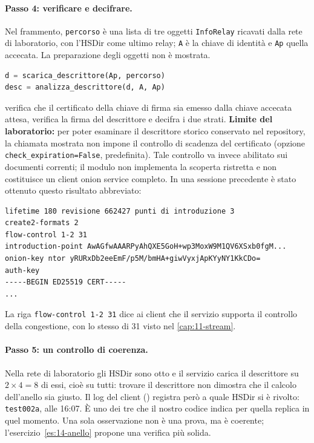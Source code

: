 \paragraph{Passo 4: verificare e decifrare.} Nel frammento, \texttt{percorso} è una lista di tre oggetti \texttt{InfoRelay} ricavati dalla rete di laboratorio, con l'HSDir come ultimo relay; \texttt{A} è la chiave di identità e \texttt{Ap} quella accecata. La preparazione degli oggetti non è mostrata.
\begin{lstlisting}[language=Python]
d = scarica_descrittore(Ap, percorso)
desc = analizza_descrittore(d, A, Ap)
\end{lstlisting}
 verifica che il certificato della chiave di firma sia emesso dalla chiave accecata attesa, verifica la firma del descrittore e decifra i due strati. \textbf{Limite del laboratorio:} per poter esaminare il descrittore storico conservato nel repository, la chiamata mostrata non impone il controllo di scadenza del certificato (opzione \texttt{check\_expiration=False}, predefinita). Tale controllo va invece abilitato sui documenti correnti; il modulo non implementa la scoperta ristretta e non costituisce un client onion service completo. In una sessione precedente è stato ottenuto questo risultato abbreviato:
\begin{lstlisting}[numbers=none]
lifetime 180 revisione 662427 punti di introduzione 3
create2-formats 2
flow-control 1-2 31
introduction-point AwAGfwAAARPyAhQXE5GoH+wp3MoxW9M1QV6XSxb0fgM...
onion-key ntor yRURxDb2eeEmF/p5M/bmHA+giwVyxjApKYyNY1KkCDo=
auth-key
-----BEGIN ED25519 CERT-----
...
\end{lstlisting}
La riga \texttt{flow-control 1-2 31} dice ai client che il servizio supporta il controllo della congestione, con lo stesso  di 31 visto nel \cref{cap:11-stream}.

\paragraph{Passo 5: un controllo di coerenza.} Nella rete di laboratorio gli HSDir sono otto e il servizio carica il descrittore su $2 \times 4 = 8$ di essi, cioè su tutti: trovare il descrittore non dimostra che il calcolo dell'anello sia giusto. Il log del client () registra però a quale HSDir si è rivolto: \texttt{test002a}, alle 16:07. È uno dei tre che il nostro codice indica per quella replica in quel momento. Una sola osservazione non è una prova, ma è coerente; l'esercizio~\ref{es:14-anello} propone una verifica più solida.

